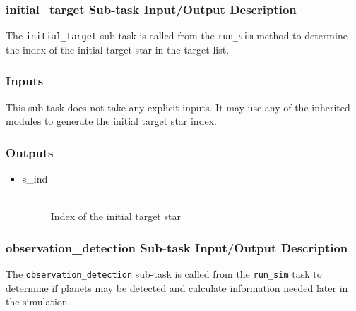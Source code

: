 \documentclass[cleanfoot]{asme2ej}
\begin{document}
\subsubsection{initial\_target Sub-task Input/Output Description} \label{sec:initialtargettask}
The \verb+initial_target+ sub-task is called from the \verb+run_sim+ method to determine the index of the initial target star in the target list.

\subsubsection*{Inputs}
This sub-task does not take any explicit inputs.  It may use any of the inherited modules to generate the initial target star index.

\subsubsection*{Outputs}
\begin{itemize}
    \item 
    \begin{description}
        \item[s\_ind] \hfill \\
        Index of the initial target star
    \end{description}
\end{itemize}

\subsubsection{observation\_detection Sub-task Input/Output Description} \label{sec:observationdetectiontask}
The \verb+observation_detection+ sub-task is called from the \verb+run_sim+ task to determine if planets may be detected and calculate information needed later in the simulation.
\end{document}
